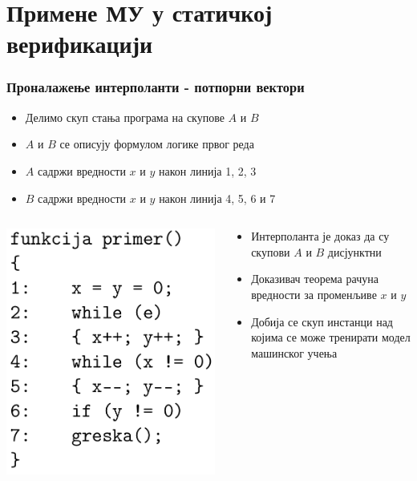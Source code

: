 \documentclass{beamer}
\begin{document}
\section{Примене МУ у статичкој верификацији}
\begin{frame}[fragile]
\frametitle{Проналажење интерполанти - потпорни вектори}

\begin{itemize}
    \item Делимо скуп стања програма на скупове $A$ и  $B$
    \item $A$ и $B$ се описују формулом логике првог реда
    \item $A$ садржи вредности $x$ и  $y$ након линија 1, 2, 3
    \item $B$ садржи вредности $x$ и $y$ након линија 4, 5, 6 и 7
\end{itemize}
\begin{columns}
\begin{column}{0.3\textwidth}
    \begin{center}
        \includegraphics[scale=0.17]{./slike/interpolant_code2.png}
    \end{center}
\end{column}
\begin{column}{0.7\textwidth}  %
	\begin{itemize}
    \item Интерполанта је доказ да су скупови $A$ и  $B$ дисјунктни
    \item Доказивач теорема рачуна вредности за променљиве $x$ и  $y$
    \item Добија се скуп инстанци над којима се може тренирати модел машинског учења
    \end{itemize}
\end{column}
\end{columns}


\end{frame}
\end{document}
